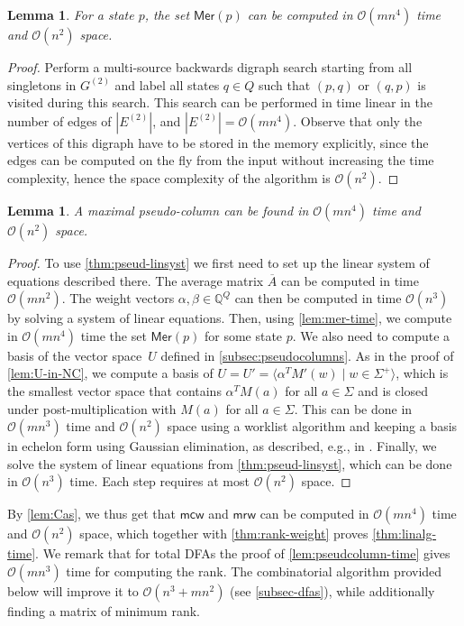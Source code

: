 \documentclass[11pt,a4paper]{amsart}
\newcommand{\OO}{\mathcal{O}}
\newcommand{\spn}[1]{\mathord{\langle #1 \rangle}}
\newcommand{\Mer}{\mathsf{Mer}}
\newcommand{\mcw}{\mathsf{mcw}}
\newcommand{\mrw}{\mathsf{mrw}}
\theoremstyle{plain}
\newtheorem{lem}[thm]{Lemma}
\theoremstyle{definition}
\theoremstyle{defC}
\theoremstyle{thmC}
\theoremstyle{plain}
\numberwithin{equation}{section}
\begin{document}
\begin{lem}\label{lem:mer-time}
    For a state $p$, the set $\Mer(p)$ can be computed in $\OO(mn^4)$ time and $\OO(n^2)$ space.
\end{lem}
\begin{proof}
    Perform a multi-source backwards digraph search starting from all singletons in $G^{(2)}$ and label all states $q \in Q$ such that $(p, q)$ or $(q, p)$ is visited during this search. This search can be performed in time linear in the number of edges of $|E^{(2)}|$, and $|E^{(2)}| = \OO(mn^4)$. 
    Observe that only the vertices of this digraph have to be stored in the memory explicitly, since the edges can be computed on the fly from the input without increasing the time complexity, hence the space complexity of the algorithm is $\OO(n^2)$.
\end{proof}

\begin{lem}\label{lem:pseudcolumn-time}
    A maximal pseudo-column can be found in $\OO(mn^4)$ time and $\OO(n^2)$ space.
\end{lem}
\begin{proof}
To use \autoref{thm:pseud-linsyst} we first need to set up the linear system of equations described there.
The average matrix $\overline{A}$ can be computed in time $\OO(m n^2)$.
The weight vectors $\alpha, \beta \in \mathbb{Q}^Q$ can then be computed in time $\OO(n^3)$ by solving a system of linear equations.
Then, using \autoref{lem:mer-time},
we compute in $\OO(mn^4)$ time the set $\Mer(p)$ for some state $p$.
We also need to compute a basis of the vector space~$U$ defined in \autoref{subsec:pseudocolumns}.
As in the proof of \autoref{lem:U-in-NC}, we compute a basis of $U = U' = \spn{\alpha^T M'(w) \mid w \in \Sigma^+}$, which is the smallest vector space that contains $\alpha^T M(a)$ for all $a \in \Sigma$ and is closed under post-multiplication with $M(a)$ for all $a \in \Sigma$.
This can be done in $\OO(mn^3)$ time and $\OO(n^2)$ space using a worklist algorithm and keeping a basis in echelon form using Gaussian elimination, as described, e.g., in \cite[Section 2]{KieferWeighted20}.
Finally, we solve the system of linear equations from \autoref{thm:pseud-linsyst}, 
which can be done in $\OO(n^3)$ time.
Each step requires at most $\OO(n^2)$ space.
\end{proof}

\noindent
By \autoref{lem:Cas}, we thus get that $\mcw$ and $\mrw$ can be computed in  $\OO(mn^4)$ time and $\OO(n^2)$ space, which together with \autoref{thm:rank-weight} proves \autoref{thm:linalg-time}. 
We remark that for total DFAs the proof of \autoref{lem:pseudcolumn-time} gives $\OO(mn^3)$ time for computing the rank. The combinatorial algorithm provided below will improve it to $\OO(n^3 + mn^2)$ (see \autoref{subsec-dfas}), while additionally finding a matrix of minimum rank.
\end{document}
